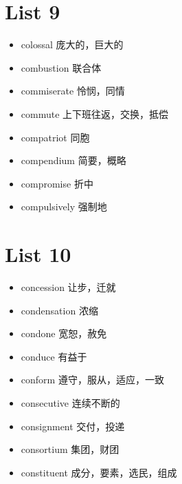 \documentclass[a4paper,10pt]{article}
\begin{document}
\begin{CJK*}{UTF8}{gkai}
\section{List 9}
\begin{itemize}
\item colossal 庞大的，巨大的
\hspace{1cm}
\item combustion 联合体
\hspace{1cm}
\item commiserate 怜悯，同情
\hspace{1cm}
\item commute 上下班往返，交换，抵偿
\hspace{1cm}
\item compatriot 同胞
\hspace{1cm}
\item compendium 简要，概略
\hspace{1cm}
\item compromise 折中
\hspace{1cm}
\item compulsively 强制地
\hspace{1cm}
\end{itemize}

\newpage
\section{List 10}
\begin{itemize}
\item concession 让步，迁就 
\hspace{1cm}
\item condensation 浓缩
\hspace{1cm}
\item condone 宽恕，赦免
\hspace{1cm}
\item conduce 有益于
\hspace{1cm}
\item conform 遵守，服从，适应，一致
\hspace{1cm}
\item consecutive 连续不断的
\hspace{1cm}
\item consignment 交付，投递
\hspace{1cm}
\item consortium 集团，财团
\hspace{1cm}
\item constituent 成分，要素，选民，组成
\hspace{1cm}
\end{itemize}


\end{CJK*}
\end{document}
